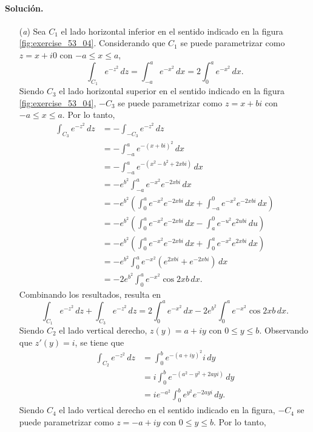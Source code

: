 \documentclass[a4paper]{report}
\begin{document}
\paragraph{Solución.}

\begin{enumerate}
 \item[(\textit{a})] Sea \(C_1\) el lado horizontal inferior en el sentido indicado en la figura \ref{fig:exercise_53_04}. Considerando que \(C_1\) se puede parametrizar como \(z=x+i0\) con \(-a\leq x\leq a\),
 \[
  \int_{C_1}e^{-z^2}\,dz=\int_{-a}^a e^{-x^2}\,dx=2\int_0^ae^{-x^2}\,dx.
 \]
 Siendo \(C_3\) el lado horizontal superior en el sentido indicado en la figura \ref{fig:exercise_53_04}, \(-C_3\) se puede parametrizar como \(z=x+bi\)  con \(-a\leq x\leq a\). Por lo tanto,
 \begin{align*}
   \int_{C_3}e^{-z^2}\,dz&=-\int_{-C_3}e^{-z^2}\,dz\\
    &=-\int_{-a}^a e^{-(x+bi)^2}\,dx\\
    &=-\int_{-a}^a e^{-(x^2-b^2+2xbi)}\,dx\\
    &=-e^{b^2}\int_{-a}^a e^{-x^2}e^{-2xbi}\,dx\\
    &=-e^{b^2}\left(\int_0^a e^{-x^2}e^{-2xbi}\,dx+\int_{-a}^0 e^{-x^2}e^{-2xbi}\,dx\right)\\
    &=-e^{b^2}\left(\int_0^a e^{-x^2}e^{-2xbi}\,dx-\int_{a}^0 e^{-u^2}e^{2ubi}\,du\right)\\
    &=-e^{b^2}\left(\int_0^a e^{-x^2}e^{-2xbi}\,dx+\int_0^a e^{-x^2}e^{2xbi}\,dx\right)\\
    &=-e^{b^2}\int_0^a e^{-x^2}\left(e^{2xbi}+e^{-2xbi}\right)\,dx\\
    &=-2e^{b^2}\int_0^a e^{-x^2}\cos 2xb\,dx.
 \end{align*}
 Combinando los resultados, resulta en
 \[
  \int_{C_1}e^{-z^2}\,dz+\int_{C_3}e^{-z^2}\,dz=2\int_0^ae^{-x^2}\,dx-2e^{b^2}\int_0^a e^{-x^2}\cos 2xb\,dx.
 \]
 Siendo \(C_2\) el lado vertical derecho, \(z(y)=a+iy\) con \(0\leq y\leq b\). Observando que \(z'(y)=i\), se tiene que 
 \begin{align*}
  \int_{C_2}e^{-z^2}\,dz&=\int_0^b e^{-(a+iy)^2}i\,dy\\
    &=i\int_0^b e^{-(a^2-y^2+2ayi)}\,dy\\
    &=ie^{-a^2}\int_0^b e^{y^2}e^{-2ayi}\,dy.
 \end{align*}
 Siendo \(C_4\) el lado vertical derecho en el sentido indicado en la figura, \(-C_4\) se puede parametrizar como \(z=-a+iy\) con \(0\leq y\leq b\). Por lo tanto,
 \begin{align*}

\end{align*}
\end{enumerate}
\end{document}

